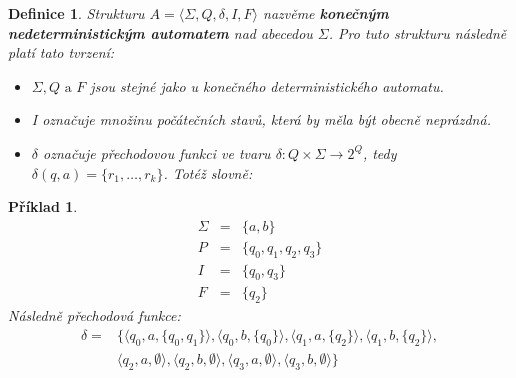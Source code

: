\documentclass[10pt, a4paper, titlepage]{article}
\theoremstyle{note}
\newtheorem{definice}{\textbf{Definice}}
\newtheorem{priklad}{\textbf{Příklad}}
\begin{document}
\begin{definice}
Strukturu $A = \langle \Sigma, Q, \delta, I, F \rangle$ nazvěme \textbf{konečným nedeterministickým automatem} nad abecedou $\Sigma$. Pro tuto strukturu následně platí tato tvrzení:
\begin{itemize}
\item
$\Sigma, Q \text{ a } F$ jsou stejné jako u konečného deterministického automatu.
\item
\textit{I} označuje množinu počátečních stavů, která by měla být obecně neprázdná.
\item
$\delta$ označuje přechodovou funkci ve tvaru $\delta : Q \times \Sigma \rightarrow 2^{Q}$, tedy $\delta (q, a) = \lbrace r_{1}, \ldots, r_{k} \rbrace$. Totéž slovně: 
\end{itemize}
\end{definice}

\begin{priklad}\label{priklad-3}
\begin{eqnarray*}
\Sigma &=& \lbrace a, b \rbrace \\
P &=& \lbrace q_{0}, q_{1}, q_{2}, q_{3} \rbrace \\
I &=& \lbrace q_{0}, q_{3} \rbrace \\
F &=& \lbrace q_{2} \rbrace 
\end{eqnarray*}
Následně přechodová funkce:
\begin{eqnarray*}
\delta =&
\lbrace
\langle q_{0}, a, \lbrace q_{0},q_{1} \rbrace \rangle,
\langle q_{0}, b, \lbrace q_{0} \rbrace \rangle,
\langle q_{1}, a, \lbrace q_{2} \rbrace \rangle,
\langle q_{1}, b, \lbrace q_{2} \rbrace \rangle, \\
& \langle q_{2}, a, \emptyset \rangle,
\langle q_{2}, b, \emptyset \rangle,
\langle q_{3}, a, \emptyset \rangle,
\langle q_{3}, b, \emptyset \rangle 
\rbrace
\end{eqnarray*}
\end{priklad}
\end{document}

